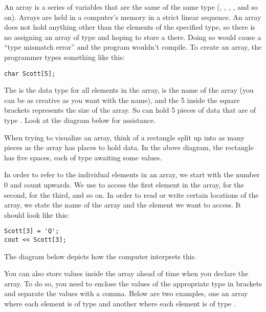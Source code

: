 An array is a series of variables that are the same of the same type (, , , , and so on).
Arrays are held in a computer's memory in a strict linear sequence.
An array does not hold anything other than the elements of the specified type, so there is no assigning an array of type  and hoping to store a  there. 
Doing so would cause a ``type mismatch error'' and the program wouldn't compile. 
To create an array, the programmer types something like this:

\noindent\begin{minipage}{\linewidth}\begin{lstlisting}
char Scott[5];
\end{lstlisting}\end{minipage}

The  is the data type for all elements in the array,  is the name of the array (you can be as creative as you want with the name), and the 5 inside the square brackets represents the size of the array. 
So  can hold 5 pieces of data that are of type . 
Look at the diagram below for assistance.


When trying to visualize an array, think of a rectangle split up into as many pieces as the array has places to hold data.
In the above diagram, the rectangle has five spaces, each of type  awaiting some values. 

In order to refer to the individual elements in an array, we start with the number 0 and count upwards. 
We use \Code{[0]} to access the first element in the array, \Code{[1]} for the second, \Code{[2]} for the third, and so on. 
In order to read or write certain locations of the array, we state the name of the array and the element we want to access. 
It should look like this:

\noindent\begin{minipage}{\linewidth}\begin{lstlisting}
Scott[3] = 'Q';
cout << Scott[3];
\end{lstlisting}\end{minipage}

The diagram below depicts how the computer interprets this.


You can also store values inside the array ahead of time when you declare the array. 
To do so, you need to enclose the values of the appropriate type in brackets and separate the values with a comma. 
Below are two examples, one an array where each element is of type  and another where each element is of type .

